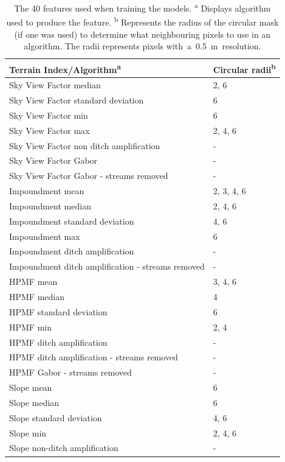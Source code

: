 \documentclass[11pt, review]{elsarticle} %
\begin{document}
\begin{table} [H]
\centering
    {\begin{tabular}{l|l}
      \textbf{Terrain Index/Algorithm}\textsuperscript{a} & \textbf{Circular radii}\textsuperscript{b} \\ %
      \hline
      Sky View Factor median &2, 6 \\
      Sky View Factor standard deviation & 6 \\
      Sky View Factor min & 6 \\
      Sky View Factor max & 2, 4, 6 \\
      Sky View Factor non ditch amplification & - \\ 
      Sky View Factor Gabor & - \\
      Sky View Factor Gabor - streams removed & -\\
      
      Impoundment mean & 2, 3, 4, 6 \\
      Impoundment median & 2, 4, 6 \\
      Impoundment standard deviation & 4, 6 \\
      Impoundment max & 6 \\
      Impoundment ditch amplification & - \\
      Impoundment ditch amplification - streams removed & - \\
      
      HPMF mean & 3, 4, 6 \\
      HPMF median & 4 \\
      HPMF standard deviation & 6 \\
      HPMF min & 2, 4 \\
      HPMF ditch amplification & - \\
      HPMF ditch amplification - streams removed & - \\
      HPMF Gabor - streams removed & -\\
      
      Slope mean & 6 \\
      Slope median & 6 \\
      Slope standard deviation & 4, 6 \\
      Slope min & 2, 4, 6 \\
      Slope non-ditch amplification & - \\
      \hline
    \end{tabular}}
    \caption{ The 40 features used when training the models.
    \newline \textsuperscript{a} Displays algorithm used to produce the feature. \newline
        \textsuperscript{b} Represents the radius of the circular mask (if one was used) to determine \newline what neighbouring pixels to use in an algorithm. The radii represents pixels \newline \mbox{with a 0.5 m resolution.\itshape\ignorespaces}}
    \label{featuretable}
\end{table}
\end{document}
